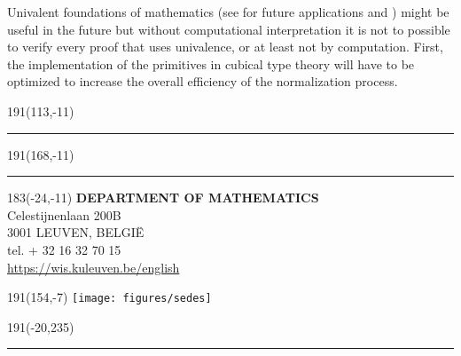 \documentclass[12pt,a4paper,twoside,xetex]{book} %
\begin{document}
Univalent foundations of mathematics (see for future applications  and ) might be useful in the future but without computational interpretation it is not to possible to verify every proof that uses univalence, or at least not by computation. First, the implementation of the primitives in cubical type theory will have to be optimized to increase the overall efficiency of the normalization process. 





\clearpage
{}
\printindex

\newpage


\newpage
\null
\newpage
\thispagestyle{empty}

\setsansfont{Helvetica}
\sffamily
%
\begin{textblock}{191}(113,-11)
{\color{blueline}\rule{160pt}{5.5pt}}
\end{textblock}
%
\begin{textblock}{191}(168,-11)
{\color{blueline}\rule{5.5pt}{59pt}}
\end{textblock}
%
\begin{textblock}{183}(-24,-11)
\textblockcolour{}
\flushright
\fontsize{7}{7.5}\selectfont
\textbf{DEPARTMENT OF MATHEMATICS}\\
Celestijnenlaan 200B\\
3001 LEUVEN, BELGI\"{E}\\
tel. + 32 16 32 70 15 \\
\url{https://wis.kuleuven.be/english}\\
\end{textblock}
%
\begin{textblock}{191}(154,-7)
\textblockcolour{}
\texttt{[image: figures/sedes]}
\end{textblock}
%
\begin{textblock}{191}(-20,235)
{\color{bluetitle}\rule{544pt}{55pt}}
\end{textblock}
\end{document}

